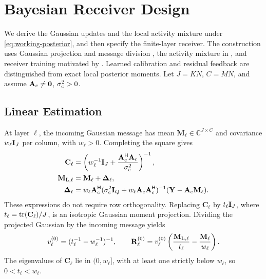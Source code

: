 \section{Bayesian Receiver Design}
\label{sec:algorithm}

We derive the Gaussian updates and the local activity mixture under
\eqref{eq:working-posterior}, and then specify the finite-layer receiver.
The construction uses Gaussian projection and message division
\cite{minka2001}, the activity mixture in \cite[Sec.~III-B]{cai2026},
and receiver training motivated by \cite{wei2026}.
Learned calibration and residual feedback are distinguished from exact
local posterior moments. Let $J=KN$, $C=MN$, and assume
$\mathbf A_{\rm c}\ne\mathbf0$, $\sigma_{\rm c}^2>0$.

\subsection{Linear Estimation}

At layer $\ell$, the incoming Gaussian message has mean
$\mathbf M_\ell\in\mathbb C^{J\times C}$ and covariance $w_\ell\mathbf{I}_J$
per column, with $w_\ell>0$. Completing the square gives
\begin{align}
 \mathbf C_\ell
 &=\left(w_\ell^{-1}\mathbf{I}_J+
 \frac{\mathbf A_{\rm c}^{\mathsf H}\mathbf A_{\rm c}}{\sigma_{\rm c}^2}
 \right)^{-1},
 \label{eq:twc-linear-covariance}\\
 \mathbf M_{{\rm L},\ell}&=\mathbf M_\ell+\bm\Delta_\ell,
 \label{eq:twc-linear-mean}\\
 \bm\Delta_\ell&=w_\ell\mathbf A_{\rm c}^{\mathsf H}
 (\sigma_{\rm c}^2\mathbf{I}_Q+w_\ell\mathbf A_{\rm c}\mathbf A_{\rm c}^{\mathsf H})^{-1}
 (\mathbf Y-\mathbf A_{\rm c}\mathbf M_\ell).
 \label{eq:twc-linear-correction}
\end{align}
These expressions do not require row orthogonality. Replacing
$\mathbf C_\ell$ by $t_\ell\mathbf{I}_J$, where $t_\ell=\operatorname{tr}(\mathbf C_\ell)/J$,
is an isotropic Gaussian moment projection. Dividing the projected
Gaussian by the incoming message yields
\begin{equation}
 v_\ell^{(0)}=(t_\ell^{-1}-w_\ell^{-1})^{-1},\qquad
 \mathbf R_\ell^{(0)}=v_\ell^{(0)}
 \left(\frac{\mathbf M_{{\rm L},\ell}}{t_\ell}
       -\frac{\mathbf M_\ell}{w_\ell}\right).
 \label{eq:twc-linear-extrinsic}
\end{equation}
The eigenvalues of $\mathbf C_\ell$ lie in $(0,w_\ell]$, with at least
one strictly below $w_\ell$, so $0<t_\ell<w_\ell$.

